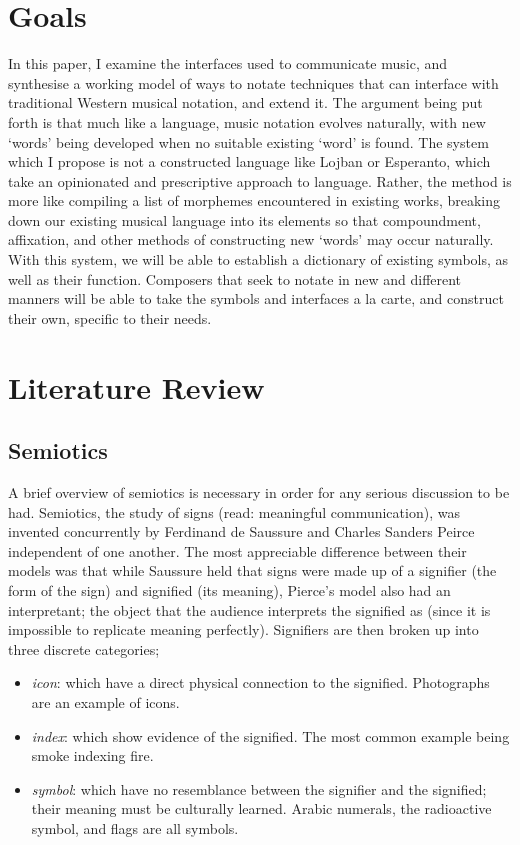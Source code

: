 \section{Goals}

In this paper, I examine the interfaces used to communicate music, and synthesise a working model of ways to notate techniques that can interface with traditional Western musical notation, and extend it.
The argument being put forth is that much like a language, music notation evolves naturally, with new `words' being developed when no suitable existing `word' is found.
The system which I propose is not a constructed language like Lojban or Esperanto, which take an opinionated and prescriptive approach to language. 
Rather, the method is more like compiling a list of morphemes encountered in existing works, breaking down our existing musical language into its elements so that compoundment, affixation, and other methods of constructing new `words' may occur naturally.
With this system, we will be able to establish a dictionary of existing symbols, as well as their function.
Composers that seek to notate in new and different manners will be able to take the symbols and interfaces a la carte, and construct their own, specific to their needs.

\section{Literature Review}

\subsection{Semiotics}

A brief overview of semiotics is necessary in order for any serious discussion to be had.
Semiotics, the study of signs (read: meaningful communication), was invented concurrently by Ferdinand de Saussure and Charles Sanders Peirce independent of one another.\autocite[]{saussure}
The most appreciable difference between their models was that while Saussure held that signs were made up of a signifier (the form of the sign) and signified (its meaning), Pierce's model also had an interpretant; the object that the audience interprets the signified as (since it is impossible to replicate meaning perfectly).\autocite[]{pierce}
Signifiers are then broken up into three discrete categories; 
\begin{itemize}
\item \emph{\gls{icon}}: which have a direct physical connection to the signified. Photographs are an example of icons.
\item \emph{\gls{index}}: which show evidence of the signified. The most common example being smoke indexing fire.
\item \emph{\gls{symbol}}: which have no resemblance between the signifier and the signified; their meaning must be culturally learned. Arabic numerals, the radioactive symbol, and flags are all symbols.
\end{itemize}

